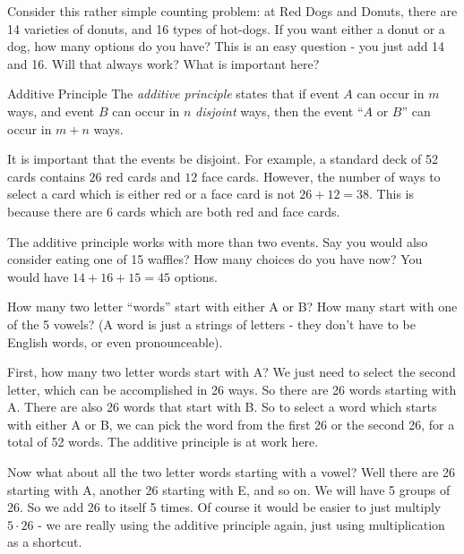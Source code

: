 \documentclass[12pt]{article}
\begin{document}
Consider this rather simple counting problem: at Red Dogs and Donuts, there are 14 varieties of donuts, and 16 types of hot-dogs.  If you want either a donut or a dog, how many options do you have?  This is an easy question - you just add 14 and 16.  Will that always work?  What is important here?


\begin{defbox}{Additive Principle}
  The {\em additive principle} states that if event $A$ can occur in $m$ ways, and event $B$ can occur in $n$ {\em disjoint} ways, then the event ``$A$ or $B$'' can occur in $m + n$ ways.  
\end{defbox}

It is important that the events be disjoint.  For example, a standard deck of 52 cards contains $26$ red cards and $12$ face cards.  However, the number of ways to select a card which is either red or a face card is not $26 + 12 = 38$.  This is because there are 6 cards which are both red and face cards.

The additive principle works with more than two events.  Say you would also consider eating one of 15 waffles?  How many choices do you have now?  You would have $14 + 16 + 15 = 45$ options.

\begin{example}
  How many two letter ``words'' start with either A or B?  How many start with one of the 5 vowels?  (A word is just a strings of letters - they don't have to be English words, or even pronounceable).
  
  \begin{solution}
    First, how many two letter words start with A?  We just need to select the second letter, which can be accomplished in 26 ways.  So there are 26 words starting with A.  There are also 26 words that start with B.  So to select a word which starts with either A or B, we can pick the word from the first 26 or the second 26, for a total of 52 words.  The additive principle is at work here.
    
    Now what about all the two letter words starting with a vowel?  Well there are 26 starting with A, another 26 starting with E, and so on.  We will have 5 groups of 26.  So we add 26 to itself 5 times.  Of course it would be easier to just multiply $5\cdot 26$ - we are really using the additive principle again, just using multiplication as a shortcut.
  \end{solution}

\end{example}
\end{document}

